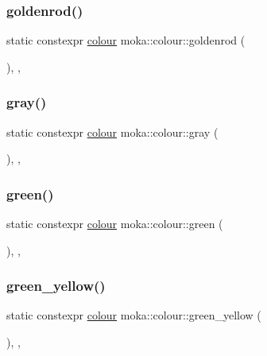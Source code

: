 \subsubsection{\texorpdfstring{goldenrod()}{goldenrod()}}
{\footnotesize\ttfamily static constexpr \mbox{\hyperlink{classmoka_1_1colour}{colour}} moka\+::colour\+::goldenrod (\begin{DoxyParamCaption}{ }\end{DoxyParamCaption})\hspace{0.3cm}{\ttfamily [inline]}, {\ttfamily [static]}, {\ttfamily [noexcept]}}

\mbox{\label{classmoka_1_1colour_a46a3131f856463932995c8ef2b49ac29}} 
\subsubsection{\texorpdfstring{gray()}{gray()}}
{\footnotesize\ttfamily static constexpr \mbox{\hyperlink{classmoka_1_1colour}{colour}} moka\+::colour\+::gray (\begin{DoxyParamCaption}{ }\end{DoxyParamCaption})\hspace{0.3cm}{\ttfamily [inline]}, {\ttfamily [static]}, {\ttfamily [noexcept]}}

\mbox{\label{classmoka_1_1colour_a4819e4a97e8f14db03406a3944db843c}} 
\subsubsection{\texorpdfstring{green()}{green()}}
{\footnotesize\ttfamily static constexpr \mbox{\hyperlink{classmoka_1_1colour}{colour}} moka\+::colour\+::green (\begin{DoxyParamCaption}{ }\end{DoxyParamCaption})\hspace{0.3cm}{\ttfamily [inline]}, {\ttfamily [static]}, {\ttfamily [noexcept]}}

\mbox{\label{classmoka_1_1colour_a637f81ba82ccaec1cd6fc6a52f707d80}} 
\subsubsection{\texorpdfstring{green\_yellow()}{green\_yellow()}}
{\footnotesize\ttfamily static constexpr \mbox{\hyperlink{classmoka_1_1colour}{colour}} moka\+::colour\+::green\+\_\+yellow (\begin{DoxyParamCaption}{ }\end{DoxyParamCaption})\hspace{0.3cm}{\ttfamily [inline]}, {\ttfamily [static]}, {\ttfamily [noexcept]}}

